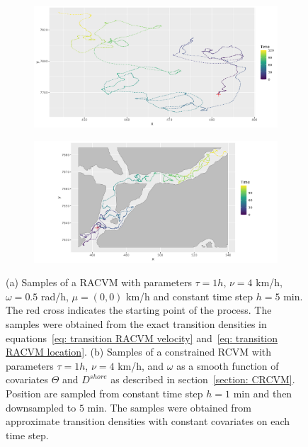 \documentclass[11pt]{article}
\newcommand {\1}{\mathbb{1}}
\begin{document}

\begin{figure}[H]
	\centering
	\begin{subfigure}{0.48\textwidth}
		\centering
		\includegraphics[scale=0.3]{images/rcvm/illustrative_sample_standard.png}
		\caption{}
	\end{subfigure}
	\begin{subfigure}{0.48\textwidth}
		\centering
		\includegraphics[scale=0.3]{images/crcvm/illustrative_sample_fjords_standard.png}
		\caption{}
	\end{subfigure}
	\caption{(a) Samples of a RACVM with parameters $\tau=1 h$, $\nu=4$ km/h,$\omega=0.5$ rad/h, $\mu=(0,0)$ km/h and constant time step $h=5$ min. The red cross indicates the starting point of the process. The samples were obtained from the exact transition densities in equations~\ref{eq: transition RACVM velocity} and~\ref{eq: transition RACVM location}. (b) Samples of a constrained RCVM with parameters $\tau=1 h$, $\nu=4$ km/h, and $\omega$ as a smooth function of covariates $\Theta$ and $D^{shore}$ as described in section~\ref{section: CRCVM}. Position are sampled from constant time step $h= 1$ min and then downsampled to $5$ min. The samples were obtained from approximate transition densities  with constant covariates on each time step.}
	\label{fig: sample RACVM}
\end{figure}
\end{document}
